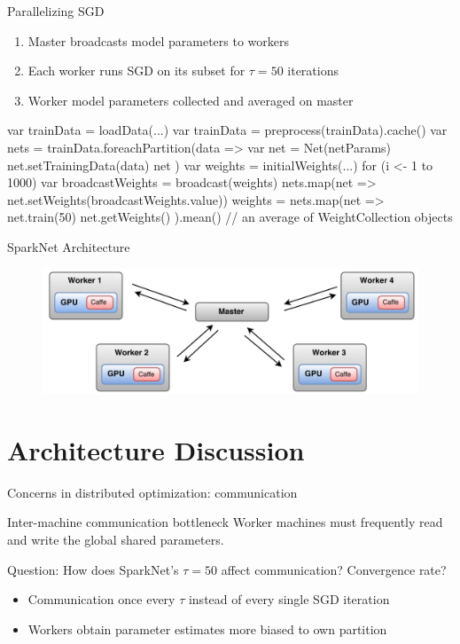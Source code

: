 \documentclass[pdf]{beamer}
\begin{document}
\begin{frame}[fragile]{Parallelizing SGD}
    \begin{enumerate}
        \item Master broadcasts model parameters to workers
        \item Each worker runs SGD on its subset for $\tau=50$ iterations
        \item Worker model parameters collected and averaged on master
    \end{enumerate}

    \begin{scalacode}
var trainData = loadData(...)
var trainData = preprocess(trainData).cache()
var nets = trainData.foreachPartition(data => {
    var net = Net(netParams)
    net.setTrainingData(data)
    net
})
var weights = initialWeights(...)
for (i <- 1 to 1000) {
    var broadcastWeights = broadcast(weights)
    nets.map(net => net.setWeights(broadcastWeights.value))
    weights = nets.map(net => {
        net.train(50)
        net.getWeights()
    }).mean() // an average of WeightCollection objects
}
    \end{scalacode}
\end{frame}


\begin{frame}{SparkNet Architecture}
\begin{figure}[htpb]
    \centering
    \includegraphics[width=0.8\linewidth]{Figures/arch.png}
\end{figure}
\end{frame}

\section{Architecture Discussion}

\begin{frame}{Concerns in distributed optimization: communication}
    \begin{block}{Inter-machine communication bottleneck}
        Worker machines must frequently read and write the global shared
        parameters.
    \end{block}


    \begin{alertblock}{Question: How does SparkNet's $\tau=50$ affect
        communication? Convergence rate?}
        \pause
        \begin{itemize}
            \item Communication once every $\tau$ instead of every single SGD iteration
            \item Workers obtain parameter estimates more biased to own partition
        \end{itemize}
    \end{alertblock}
\end{frame}
\end{document}
